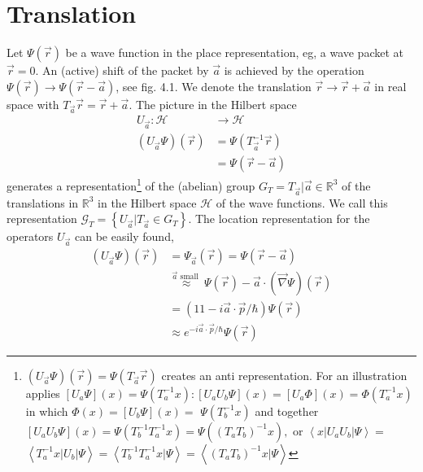 \section{Translation}
Let $\Psi(\vec{r})$ be a wave function in the place representation, eg, a wave packet at $\vec{ r} = 0$. An (active) shift of the packet by $\vec{a}$ is achieved by the operation $\Psi(\vec{r})\to\Psi(\vec{r}-\vec{a})$, see fig. 4.1. We denote the translation $\vec{r}\to\vec{r}+\vec{a}$ in real space with $T_{\vec{a}}\vec{r}=\vec{r}+\vec{a}$. The picture in the Hilbert space
\begin{equation}
\begin{aligned} U_{\vec{a}}: \mathcal{H} & \rightarrow \mathcal{H} \\\left(U_{\vec{a}} \Psi\right)(\vec{r}) &=\Psi\left(T_{\vec{a}}^{-1} \vec{r}\right) \\ &=\Psi(\vec{r}-\vec{a}) \end{aligned}
\end{equation}
generates a representation\footnote{$\left(U_{\vec{a}} \Psi\right)(\vec{r})=\Psi\left(T_{\vec{a}} \vec{r}\right)$ creates an anti representation. For an illustration applies
$\left[U_{a} \Psi\right](x)=\Psi\left(T_{a}^{-1} x\right):\left[U_{a} U_{b} \Psi\right](x)=\left[U_{a} \Phi\right](x)=\Phi\left(T_{a}^{-1} x\right)$ in which $\Phi(x)=\left[U_{b} \Psi\right](x)=$
$\Psi\left(T_{b}^{-1} x\right)$ and together $\left[U_{a} U_{b} \Psi\right](x)=\Psi\left(T_{b}^{-1} T_{a}^{-1} x\right)=\Psi\left(\left(T_{a} T_{b}\right)^{-1} x\right),$ or $\left\langle x\left|U_{a} U_{b}\right| \Psi\right\rangle=$
$\left\langle T_{a}^{-1} x\left|U_{b}\right| \Psi\right\rangle=\left\langle T_{b}^{-1} T_{a}^{-1} x | \Psi\right\rangle=\left\langle\left(T_{a} T_{b}\right)^{-1} x | \Psi\right\rangle$} of the (abelian) group $G_T = {T_{\vec{a}}| \vec{a} \in \mathbb{R}^3}$ of the translations in $\mathbb{R}^3$ in the Hilbert space $\mathcal{H}$ of the wave functions. We call this representation $\mathcal{G}_{T}=\left\{U_{\vec{a}} | T_{\vec{a}} \in G_{T}\right\}$. The location representation for the operators $U_{\vec{a}}$ can be easily found,
\begin{equation}
\begin{aligned}
    \left(U_{\vec{a}} \Psi\right)(\vec{r}) &=\Psi_{\vec{a}}(\vec{r})=\Psi(\vec{r}-\vec{a}) \\ 
    &\overset{\vec{a}\text{ small }}{\approx}  \Psi(\vec{r})-\vec{a} \cdot(\vec{\nabla} \Psi)(\vec{r}) \\ 
    &=(11-i \vec{a} \cdot \vec{p} / \hbar) \Psi(\vec{r}) \\ 
    & \approx e^{-i \vec{a} \cdot \vec{p} / \hbar} \Psi(\vec{r}) \end{aligned}
\end{equation}
